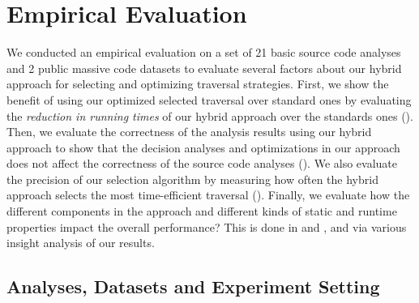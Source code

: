 \chapter{Empirical Evaluation}
\label{sec:eval}

We conducted an empirical evaluation on a set of 21 basic source code analyses
and 2 public massive code datasets to evaluate several factors about our hybrid
approach for selecting and optimizing traversal strategies.
First, we show the benefit of using our optimized selected traversal over
standard ones by evaluating the \emph{reduction in running times} of our hybrid
approach over the standards ones ().
Then, we evaluate the correctness of the analysis results using our hybrid
approach to show that the decision analyses and optimizations in our approach
does not affect the correctness of the source code analyses
().
We also evaluate the precision of our selection algorithm by measuring how often
the hybrid approach selects the most time-efficient traversal
().
Finally, we evaluate how the different components in the approach and different
kinds of static and runtime properties impact the overall performance? This is
done in  and
, and via various insight analysis of our
results.

%
%
%

\section{Analyses, Datasets and Experiment Setting}
\label{sec:exp-settings}



